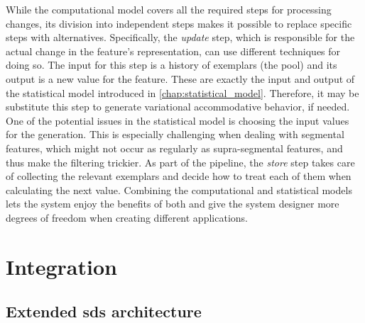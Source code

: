 While the computational model covers all the required steps for processing changes, its division into independent steps makes it possible to replace specific steps with alternatives.
Specifically, the \emph{update} step, which is responsible for the actual change in the feature's representation, can use different techniques for doing so.
The input for this step is a history of exemplars (the pool) and its output is a new value for the feature.
These are exactly the input and output of the statistical model introduced in \cref{chap:statistical_model}.
Therefore, it may be substitute this step to generate variational accommodative behavior, if needed.
One of the potential issues in the statistical model is choosing the input values for the generation.
This is especially challenging when dealing with segmental features, which might not occur as regularly as supra-segmental features, and thus make the filtering trickier.
As part of the pipeline, the \emph{store} step takes care of collecting the relevant exemplars and decide how to treat each of them when calculating the next value.
Combining the computational and statistical models lets the system enjoy the benefits of both and give the system designer more degrees of freedom when creating different applications.

\section{Integration}
\label{sec:integration}

\subsection{Extended \acl{sds} architecture}
\label{subsec:extended_sds}

